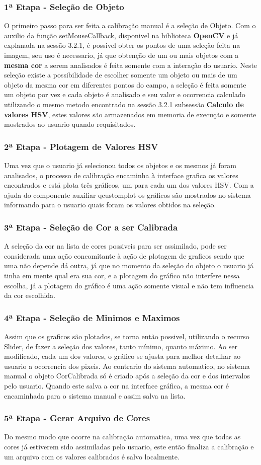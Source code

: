   	\subsubsection{1ª Etapa - Seleção de Objeto}	
  	O primeiro passo para ser feita a calibração manual é a seleção de Objeto. Com o auxilio da função setMouseCallback, disponivel na biblioteca \textbf{OpenCV} e já explanada na sessão 3.2.1, é possivel obter os pontos de uma seleção feita na imagem, seu uso é necessario, já que obtenção de um ou mais objetos com a \textbf{mesma cor} a serem analisados é feita somente com a interação do usuario. Neste seleção existe a possibilidade de escolher somente um objeto ou mais de um objeto da mesma cor em diferentes pontos do campo, a seleção é feita somente um objeto por vez e cada objeto é analisado e seu valor e ocorrencia calculado utilizando o mesmo metodo encontrado na sessão 3.2.1 subsessão \textbf{Calculo de valores HSV}, estes valores são armazenados em memoria de execução e somente mostrados ao usuario quando requisitados. 
  	
  	\subsubsection{2ª Etapa - Plotagem de Valores HSV}	
  	Uma vez que o usuario já selecionou todos os objetos e os mesmos já foram analisados, o processo de calibração encaminha à interface grafica os valores encontrados e está plota três gráficos, um para cada um dos valores HSV.
  	Com a ajuda do componente auxiliar qcustomplot os gráficos são mostrados no sistema informando para o usuario quais foram os valores obtidos na seleção.
  	
  	\subsubsection{3ª Etapa - Seleção de Cor a ser Calibrada}
  	A seleção da cor na lista de cores possiveis para ser assimilado, pode ser considerada uma ação concomitante à ação de plotagem de graficos sendo que uma não depende dá outra, já que no momento da seleção do objeto o usuario já tinha em mente qual era sua cor, e a plotagem do gráfico não interfere nessa escolha, já a plotagem do gráfico é uma ação somente visual e não tem influencia da cor escolhida.
  	
  	\subsubsection{4ª Etapa - Seleção de Minimos e Maximos}
  	 Assim que os graficos são plotados, se torna então possivel, utilizando o recurso Slider, de fazer a seleção dos valores, tanto mínimo, quanto máximo. Ao ser modificado, cada um dos valores, o gráfico se ajusta para melhor detalhar ao usuario a ocorrencia dos pixeis. Ao contrario do sistema automatico, no sistema manual o objeto CorCalibrada só é criado após a seleção da cor e dos intervalos pelo usuario. Quando este salva a cor na interface gráfica, a mesma cor é encaminhada para o sistema manual e assim salva na lista.
  	 
  	 
\subsubsection{5ª Etapa - Gerar Arquivo de Cores}
Do mesmo modo que ocorre na calibração automatica, uma vez que todas as cores já estiverem sido assimiladas pelo usuario, este então finaliza a calibração e um arquivo com os valores calibrados é salvo localmente.
  	   	
  		
  	